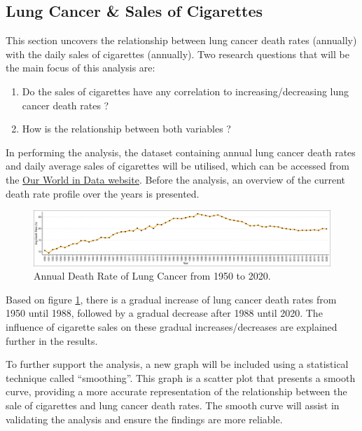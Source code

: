 \documentclass[11pt,a4paper,]{article}
\providecommand{\tightlist}{%
  \setlength{\itemsep}{0pt}\setlength{\parskip}{0pt}}
\begin{document}
\hypertarget{lung-cancer-sales-of-cigarettes}{%
\subsection{Lung Cancer \& Sales of Cigarettes}\label{lung-cancer-sales-of-cigarettes}}

This section uncovers the relationship between lung cancer death rates (annually) with the daily sales of cigarettes (annually). Two research questions that will be the main focus of this analysis are:

\begin{enumerate}
\def\labelenumi{\arabic{enumi}.}
\tightlist
\item
  Do the sales of cigarettes have any correlation to increasing/decreasing lung cancer death rates ?
\item
  How is the relationship between both variables ?
\end{enumerate}

In performing the analysis, the dataset containing annual lung cancer death rates and daily average sales of cigarettes will be utilised, which can be accessed from the \href{https://ourworldindata.org/cancer\#smoking-and-lung-cancer}{Our World in Data website}. Before the analysis, an overview of the current death rate profile over the years is presented.

\begin{figure}

{\centering \includegraphics[width=1\linewidth]{etc5513_assignment2_g1_t1_files/figure-latex/figure1-1} 

}

\caption{Annual Death Rate of Lung Cancer from 1950 to 2020.}\label{fig:figure1}
\end{figure}

Based on figure \ref{fig:figure1}, there is a gradual increase of lung cancer death rates from 1950 until 1988, followed by a gradual decrease after 1988 until 2020. The influence of cigarette sales on these gradual increases/decreases are explained further in the results.

To further support the analysis, a new graph will be included using a statistical technique called ``smoothing''. This graph is a scatter plot that presents a smooth curve, providing a more accurate representation of the relationship between the sale of cigarettes and lung cancer death rates. The smooth curve will assist in validating the analysis and ensure the findings are more reliable.
\end{document}
